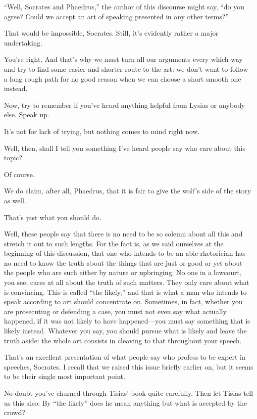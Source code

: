 “Well, Socrates and Phaedrus,” the author of this discourse might say,
“do you agree? Could we accept an art of speaking presented in any other
terms?”

\sayphaedrus That would be impossible, Socrates. Still, it’s evidently
rather a major undertaking.

\saysocrates You’re right. And that’s why we must turn all our arguments
every which way and try to find some easier and shorter route to the
art: we don’t want to follow a long rough path for no good
reason when we can choose a short smooth one instead.

Now, try to remember if you’ve heard anything helpful from Lysias or
anybody else. Speak up.

\sayphaedrus It’s not for lack of trying, but nothing comes to mind right
now.

\saysocrates Well, then, shall I tell you something I’ve heard people say
who care about this topic?

\sayphaedrus Of course.

\saysocrates We do claim, after all, Phaedrus, that it is fair to give the
wolf’s side of the story as well.

\sayphaedrus That’s just what you should do.

\saysocrates Well, these people say that there is no need to be so solemn
about all this and stretch it out to such lengths. For the fact is, as
we said ourselves at the beginning of this
discussion, that one
who intends to be an able rhetorician has no need to know the truth
about the things that are just or good or yet about the people who are
such either by nature or upbringing. No one in a lawcourt, you see,
cares at all about the truth of such matters. They only care about what
is convincing. This is called “the likely,” and that is what a
man who intends to speak according to art should concentrate on.
Sometimes, in fact, whether you are prosecuting or defending a case, you
must not even say what actually happened, if it was not likely to have
happened---you must say something that is likely instead. Whatever you
say, you should pursue what is likely and leave the truth aside: the
whole art consists in cleaving to that throughout your
speech.

\sayphaedrus That’s an excellent presentation of what people say who
profess to be expert in speeches, Socrates. I recall that we raised this
issue briefly earlier on, but it seems to be their single most important
point.

\saysocrates No doubt you’ve churned through Tisias’ book quite carefully.
Then let Tisias tell us this also: By “the likely” does he mean anything
but what is accepted by the crowd?

